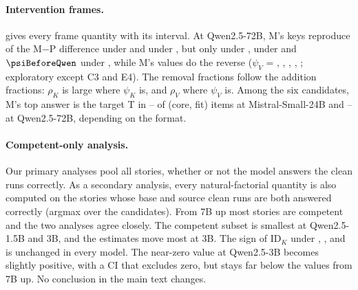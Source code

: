 \paragraph{Intervention frames.}  gives every frame quantity with its interval. At Qwen2.5-72B, M's keys reproduce \psiLetterQwen{} of the M$-$P difference under \fmtLetter{} and \psiOptQwen{} under \fmtOpt{}, but only \psiPostQwen{} under \fmtPost{}, \psiNoneQwen{} under \fmtNone{} and $\psiBeforeQwen$ under \fmtBefore{}, while M's values do the reverse ($\psi_V$ = \psiVLetterQwen{}, \psiVOptQwen{}, \psiVPostQwen{}, \psiVNoneQwen{}, \psiVBeforeQwen{}; exploratory except C3 and E4). The removal fractions follow the addition fractions: $\rho_K$ is large where $\psi_K$ is, and $\rho_V$ where $\psi_V$ is. Among the six candidates, M's top answer is the target T in \mTLetterMistral{}--\mTPostMistral{} of (core, fit) items at Mistral-Small-24B and \mTNoneQwen{}--\mTBeforeQwen{} at Qwen2.5-72B, depending on the format.

\begin{table}[!ht]
\centering
\caption{\textbf{The intervention of \citet{anonymous2026fitted} across formats.} $\varphi$: behavioural shift of the learned remap M relative to the PCA patch P, as a fraction of the natural source-to-target shift (\cref{eq:phi}). $\psi_K$, $\psi_V$: fraction of the M$-$P difference that P reproduces when given M's keys or values at the writing token (\cref{eq:psik,eq:psiv}). $\rho_K$, $\rho_V$: fraction of that difference that M loses when given P's keys or values (\cref{app:impl}). Exchanges from block~6 on. $n = 96$ story cores with B, S and T distinct, three fits averaged within each core; 95\% bootstrap CIs over cores. Preregistrations C (C1--C3) and E (E4) for the cells they name; the rest exploratory.}
\label{tab:frames}
\resizebox{\textwidth}{!}{}
\end{table}

\paragraph{Competent-only analysis.} Our primary analyses pool all stories, whether or not the model answers the clean runs correctly. As a secondary analysis, every natural-factorial quantity is also computed on the stories whose base and source clean runs are both answered correctly (argmax over the candidates). From 7B up most stories are competent and the two analyses agree closely. The competent subset is smallest at Qwen2.5-1.5B and 3B, and the estimates move most at 3B. The sign of $\mathrm{ID}_K$ under \fmtOpt{}, \fmtLetter{}, \fmtNone{} and \fmtBefore{} is unchanged in every model. The near-zero \fmtPost{} value at Qwen2.5-3B becomes slightly positive, with a CI that excludes zero, but stays far below the \fmtPost{} values from 7B up. No conclusion in the main text changes.

